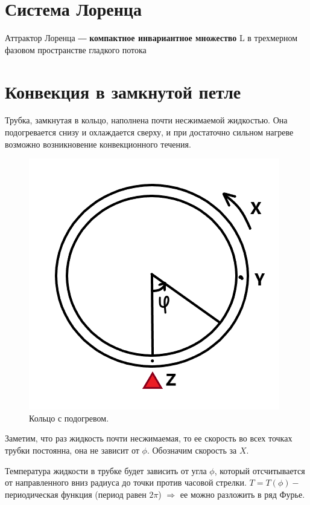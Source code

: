 \documentclass[12pt]{article}
\begin{document}

\newpage

\section{Система Лоренца}

Аттрактор Лоренца ― \textbf{компактное инвариантное множество} L в трехмерном фазовом пространстве гладкого потока

\section{Конвекция в замкнутой петле}

Трубка, замкнутая в кольцо, наполнена почти несжимаемой жидкостью. Она подогревается снизу и охлаждается сверху, и при достаточно сильном нагреве возможно возникновение конвекционного течения.

\begin{figure}[h]
	\centering
 	\includegraphics[scale=0.5]{Lorenz.png}
 	\caption{Кольцо с подогревом.}
  	\label{fig:boat1}
\end{figure}

Заметим, что раз жидкость почти несжимаемая, то ее скорость во всех точках трубки постоянна, она не зависит от $\phi$. Обозначим скорость за $X$.

Температура жидкости в трубке будет зависить от угла $\phi$, который отсчитывается от направленного вниз радиуса до точки против часовой стрелки. $T = T(\phi) -$ периодическая функция (период равен $2\pi$) $\Rightarrow$ ее можно разложить в ряд Фурье.
\end{document}
